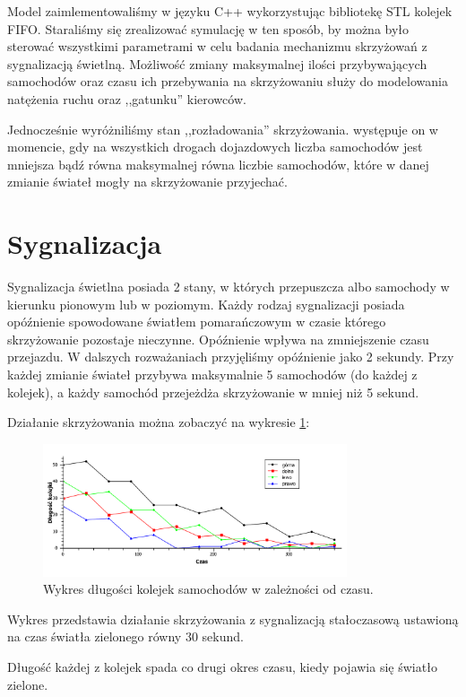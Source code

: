 \documentclass[11pt]{aghdpl}
\begin{document}
Model zaimlementowaliśmy w języku C++ wykorzystując bibliotekę STL kolejek FIFO. Staraliśmy się zrealizować symulację w ten sposób, by można było sterować wszystkimi parametrami w celu badania mechanizmu skrzyżowań z sygnalizacją świetlną. Możliwość zmiany maksymalnej ilości przybywających samochodów oraz czasu ich przebywania na skrzyżowaniu służy do modelowania natężenia ruchu oraz ,,gatunku'' kierowców.

Jednocześnie wyróżniliśmy stan ,,rozładowania'' skrzyżowania. występuje on w momencie, gdy na wszystkich drogach dojazdowych liczba samochodów jest mniejsza bądź równa maksymalnej równa liczbie samochodów, które w danej zmianie świateł mogły na skrzyżowanie przyjechać.

\section{Sygnalizacja}
Sygnalizacja świetlna posiada 2 stany, w których przepuszcza albo samochody w kierunku pionowym lub w poziomym. Każdy rodzaj sygnalizacji posiada opóźnienie spowodowane światłem pomarańczowym w czasie którego skrzyżowanie pozostaje nieczynne. Opóźnienie wpływa na zmniejszenie czasu przejazdu. W dalszych rozważaniach przyjęliśmy opóźnienie jako 2 sekundy.
Przy każdej zmianie świateł przybywa maksymalnie 5 samochodów (do każdej z kolejek), a każdy samochód przejeżdża skrzyżowanie w mniej niż 5 sekund.

Działanie skrzyżowania można zobaczyć na wykresie \ref{dzialanie}:
\begin{figure}[h!]
	\centering
	\includegraphics[width=0.80\textwidth]{dzialanie.pdf}
	\caption{Wykres długości kolejek samochodów w zależności od czasu.}	
	\label{dzialanie}
\end{figure}

Wykres przedstawia działanie skrzyżowania z sygnalizacją stałoczasową ustawioną na czas światła zielonego równy 30 sekund. 

Długość każdej z kolejek spada co drugi okres czasu, kiedy pojawia się światło zielone. 
\end{document}
